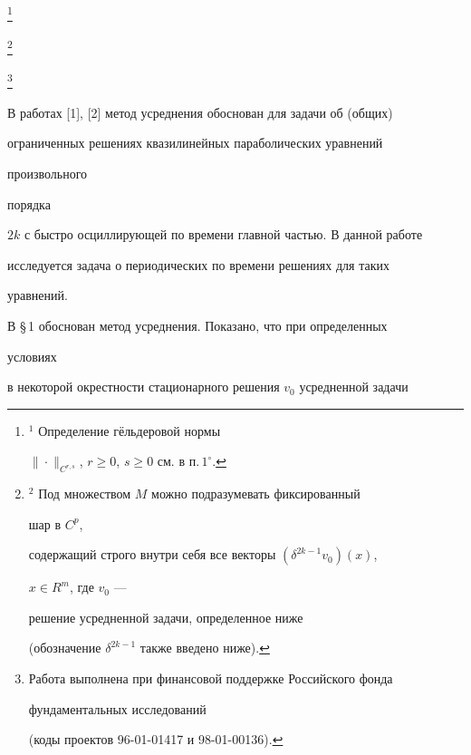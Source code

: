 \thanks{$^1$ Определение г\"ельдеровой нормы 


$\|\cdot\|_{C^{r,s}}$, $r\ge0$, $s\ge0$ см. в п.\,$1^\circ$.} 


\thanks{$^2$ Под множеством $M$ можно подразумевать фиксированный 


шар в $C^p$, 


содержащий строго внутри себя все векторы $(\delta^{2k-1}v_0)(x)$, 


$x\in R^m$, где $v_0$ --- 


решение усредненной задачи, определенное ниже 


(обозначение $\delta^{2k-1}$ также введено ниже).} 


\thanks{Работа выполнена при финансовой поддержке Российского фонда 


фундаментальных исследований 


(коды проектов 96-01-01417 и 98-01-00136).} 


 


\date{} 




\pagestyle{plain} %


 




\maketitle 


\label{begin} 


 


В работах [1], [2] метод усреднения обоснован для задачи об (общих) 


ограниченных решениях квазилинейных параболических уравнений 


произвольного 


порядка 


$2k$ с быстро осциллирующей по времени главной частью. В данной работе 


исследуется задача о периодических по времени решениях для таких 


уравнений. 


В \S\,1 обоснован метод усреднения. Показано, что при определенных 


условиях 


в некоторой окрестности стационарного решения $v_0$ усредненной задачи 


